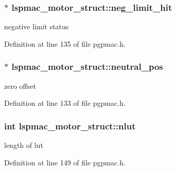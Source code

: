 \hypertarget{structlspmac__motor__struct_afe13c86941928d20357f4f3e2a4d915a}{
\subsubsection[{neg\-\_\-limit\-\_\-hit}]{$\ast$ lspmac\-\_\-motor\-\_\-struct\-::neg\-\_\-limit\-\_\-hit}}\label{structlspmac__motor__struct_afe13c86941928d20357f4f3e2a4d915a}


negative limit status 



Definition at line 135 of file pgpmac.\-h.

\hypertarget{structlspmac__motor__struct_ae931e9bc9fc2fa82ca649334fc052fbe}{
\subsubsection[{neutral\-\_\-pos}]{$\ast$ lspmac\-\_\-motor\-\_\-struct\-::neutral\-\_\-pos}}\label{structlspmac__motor__struct_ae931e9bc9fc2fa82ca649334fc052fbe}


zero offset 



Definition at line 133 of file pgpmac.\-h.

\hypertarget{structlspmac__motor__struct_a11cbc6f50c150ed446e9a901cf7cc12b}{
\subsubsection[{nlut}]{\setlength{\rightskip}{0pt plus 5cm}int lspmac\-\_\-motor\-\_\-struct\-::nlut}}\label{structlspmac__motor__struct_a11cbc6f50c150ed446e9a901cf7cc12b}


length of lut 



Definition at line 149 of file pgpmac.\-h.

